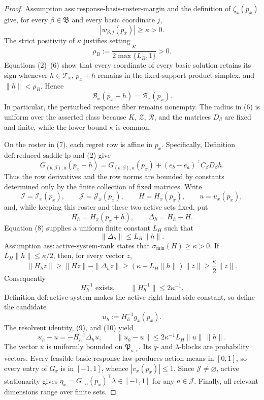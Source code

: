 \documentclass{article}
\begin{document}
\begin{proof}
Assumption \(\mathrm{ass{:}response\mbox{-}basis\mbox{-}roster\mbox{-}margin}\) and the definition of \(\zeta_x(p_x)\) give, for every \(\beta\in\mathfrak B\) and every basic coordinate \(j\),
\[
 |w_{\beta,j}(p_x)|\geq\kappa>0.
 \tag{5}
\]
The strict positivity of \(\kappa\) justifies setting
\[
 \rho_B:=\frac{\kappa}{2\max\{L_B,1\}}>0.
 \tag{6}
\]
Equations (2)--(6) show that every coordinate of every basic solution retains its sign whenever \(h\in\mathcal T_x\), \(p_x+h\) remains in the fixed-support product simplex, and \(\|h\|<\rho_B\).  Hence
\[
 \mathcal B_x(p_x+h)=\mathcal B_x(p_x).
 \tag{7}
\]
In particular, the perturbed response fiber remains nonempty.  The radius in (6) is uniform over the asserted class because \(K\), \(\mathcal Z\), \(\mathcal R\), and the matrices \(D_\beta\) are fixed and finite, while the lower bound \(\kappa\) is common.

On the roster in (7), each regret row is affine in \(p_x\).  Specifically, Definition \(\mathrm{def{:}reduced\mbox{-}saddle\mbox{-}lp}\) and (2) give
\[
 G_{(b,\beta),a}(p_x+h)
 =G_{(b,\beta),a}(p_x)
  +(e_b-e_a)^\top C_\beta D_\beta h.
 \tag{8}
\]
Thus the row derivatives and the row norms are bounded by constants determined only by the finite collection of fixed matrices.  Write
\[
 \mathcal I=\mathcal I_x(p_x),\qquad
 \mathcal J=\mathcal J_x(p_x),\qquad
 H=H_x(p_x),\qquad u=u_x(p_x),
\]
and, while keeping this roster and these two active sets fixed, put
\[
 H_h=H_x(p_x+h),\qquad \Delta_h=H_h-H.
\]
Equation (8) supplies a uniform finite constant \(L_H\) such that
\[
 \|\Delta_h\|\leq L_H\|h\|.
 \tag{9}
\]
Assumption \(\mathrm{ass{:}active\mbox{-}system\mbox{-}rank}\) states that \(\sigma_{\min}(H)\geq\kappa>0\).  If \(L_H\|h\|\leq\kappa/2\), then, for every vector \(z\),
\[
 \|H_hz\|\geq\|Hz\|-\|\Delta_hz\|
 \geq(\kappa-L_H\|h\|)\|z\|
 \geq\frac{\kappa}{2}\|z\|.
\]
Consequently
\[
 H_h^{-1}\text{ exists},\qquad \|H_h^{-1}\|\leq2\kappa^{-1}.
 \tag{10}
\]
Definition \(\mathrm{def{:}active\mbox{-}system}\) makes the active right-hand side constant, so define the candidate
\[
 u_h:=H_h^{-1}g_x(p_x).
 \tag{11}
\]
The resolvent identity, (9), and (10) yield
\[
 u_h-u=-H_h^{-1}\Delta_hu,\qquad
 \|u_h-u\|\leq2\kappa^{-1}L_H\|u\|\,\|h\|.
 \tag{12}
\]
The vector \(u\) is uniformly bounded on \(\mathfrak P_{\kappa,\varepsilon}\).  Its \(q\)- and \(\lambda\)-blocks are probability vectors.  Every feasible basic response law produces action means in \([0,1]\), so every entry of \(G_x\) is in \([-1,1]\), whence \(|v_x(p_x)|\leq1\).  Since \(\mathcal J\neq\varnothing\), active stationarity gives \(\eta_x=G_{\cdot,a}(p_x)^\top\lambda\in[-1,1]\) for any \(a\in\mathcal J\).  Finally, all relevant dimensions range over finite sets.


\end{proof}
\end{document}
